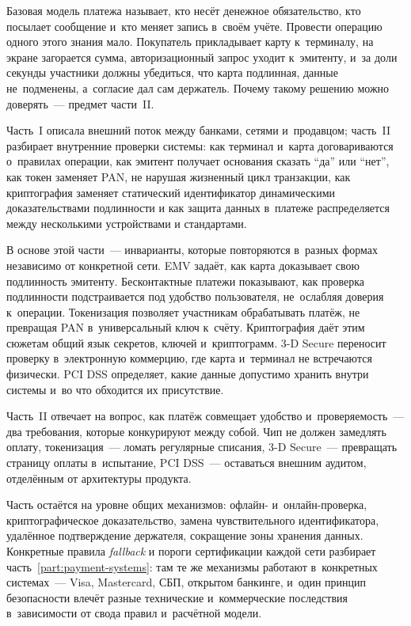 %
Базовая модель платежа называет, кто несёт денежное обязательство, кто
посылает сообщение и~кто меняет запись в~своём учёте. Провести операцию одного
этого знания мало. Покупатель прикладывает карту к~терминалу, на экране
загорается сумма, авторизационный запрос уходит к~эмитенту, и~за доли секунды
участники должны убедиться, что карта подлинная, данные не~подменены, а~согласие
дал сам держатель. Почему такому решению можно доверять~--- предмет части~II.

Часть~I описала внешний поток между банками, сетями и~продавцом; часть~II
разбирает внутренние проверки системы: как терминал и~карта договариваются
о~правилах операции, как эмитент получает основания сказать \enquote{да} или
\enquote{нет}, как токен заменяет PAN, не нарушая жизненный цикл транзакции,
как криптография заменяет статический идентификатор динамическими
доказательствами подлинности и как защита данных в~платеже распределяется между
несколькими устройствами и стандартами.

В основе этой части~--- инварианты, которые повторяются в~разных формах
независимо от конкретной сети. EMV задаёт, как карта доказывает свою
подлинность эмитенту. Бесконтактные платежи показывают, как проверка
подлинности подстраивается под удобство пользователя, не~ослабляя доверия
к~операции. Токенизация позволяет участникам обрабатывать платёж, не превращая
PAN в~универсальный ключ к~счёту. Криптография даёт этим сюжетам общий язык
секретов, ключей и~криптограмм.
3-D Secure переносит проверку в~электронную коммерцию, где карта
и~терминал не встречаются физически. PCI DSS определяет, какие данные
допустимо хранить внутри системы и~во что обходится их присутствие.

Часть~II отвечает на вопрос, как платёж совмещает удобство и~проверяемость~---
два требования, которые конкурируют между собой. Чип не должен замедлять оплату,
токенизация~--- ломать регулярные списания, 3-D Secure~---
превращать страницу оплаты в~испытание, PCI DSS~--- оставаться внешним аудитом,
отделённым от архитектуры продукта.

Часть остаётся на уровне общих механизмов: офлайн- и~онлайн-проверка,
криптографическое доказательство, замена чувствительного идентификатора,
удалённое подтверждение держателя, сокращение зоны хранения данных. Конкретные
правила \textit{fallback} и пороги сертификации каждой сети разбирает
часть~\ref{part:payment-systems}: там те же механизмы работают в~конкретных
системах~--- Visa, Mastercard, СБП, открытом банкинге, и~один принцип
безопасности влечёт разные технические и~коммерческие последствия в~зависимости
от свода правил и~расчётной модели.
